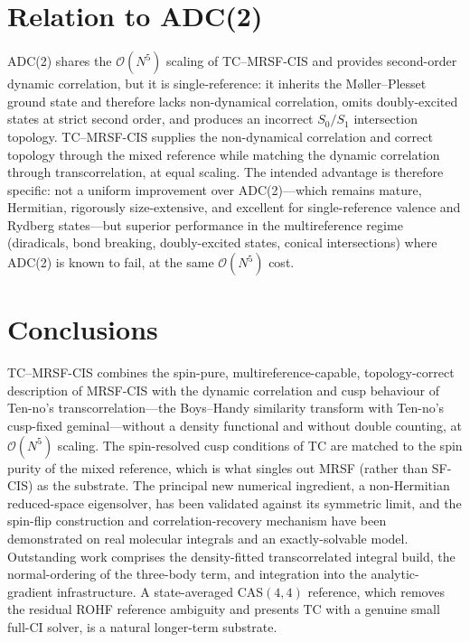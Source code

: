 \documentclass[aps,prb,reprint,superscriptaddress,floatfix]{revtex4-2}
\begin{document}
\section{Relation to ADC(2)}

ADC(2) shares the $\mathcal{O}(N^5)$ scaling of TC--MRSF-CIS and provides
second-order dynamic correlation, but it is single-reference: it inherits the
M{\o}ller--Plesset ground state and therefore lacks non-dynamical correlation,
omits doubly-excited states at strict second order, and produces an incorrect
$S_0/S_1$ intersection topology. TC--MRSF-CIS supplies the non-dynamical
correlation and correct topology through the mixed reference while matching the
dynamic correlation through transcorrelation, at equal scaling. The intended
advantage is therefore specific: not a uniform improvement over ADC(2)---which
remains mature, Hermitian, rigorously size-extensive, and excellent for
single-reference valence and Rydberg states---but superior performance in the
multireference regime (diradicals, bond breaking, doubly-excited states, conical
intersections) where ADC(2) is known to fail, at the same $\mathcal{O}(N^5)$ cost.

\section{Conclusions}

TC--MRSF-CIS combines the spin-pure, multireference-capable, topology-correct
description of MRSF-CIS with the dynamic correlation and cusp behaviour of Ten-no's
transcorrelation---the Boys--Handy similarity transform with Ten-no's cusp-fixed
geminal---without a density functional and without double
counting, at $\mathcal{O}(N^5)$ scaling. The spin-resolved cusp conditions of TC
are matched to the spin purity of the mixed reference, which is what singles out
MRSF (rather than SF-CIS) as the substrate. The principal new numerical ingredient,
a non-Hermitian reduced-space eigensolver, has been validated against its
symmetric limit, and the spin-flip construction and correlation-recovery mechanism
have been demonstrated on real molecular integrals and an exactly-solvable model.
Outstanding work comprises the density-fitted transcorrelated integral build, the
normal-ordering of the three-body term, and integration into the
analytic-gradient infrastructure. A state-averaged CAS$(4,4)$ reference, which
removes the residual ROHF reference ambiguity and presents TC with a genuine
small full-CI solver, is a natural longer-term substrate.
\end{document}
